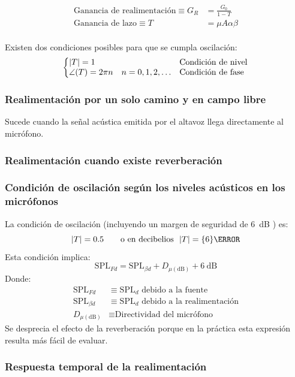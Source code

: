 \documentclass[a4paper, 8pt]{extarticle}
\begin{document}
\begin{multicols}{3}
  \begin{align*}
    \text{Ganancia de realimentación} \equiv G_R & = \frac{G_0}{1 - T}  \\
    \text{Ganancia de lazo} \equiv T             & = \mu A \alpha \beta \\
  \end{align*}

  Existen dos condiciones posibles para que se cumpla oscilación:
  \[ \left\lbrace
    \begin{matrix*}[l]
      \abs{T} = 1 & \text{Condición de nivel} \\
      \angle (T) = 2\pi n \quad n = 0,1,2, \ldots & \text{Condición de fase} \\
    \end{matrix*} \right. \]

  \subsubsection{Realimentación por un solo camino y en campo libre}
  Sucede cuando la señal acústica emitida por el altavoz llega directamente al micrófono.
  \subsubsection{Realimentación cuando existe reverberación}
  \subsubsection{Condición de oscilación según los niveles acústicos en los micrófonos}
  La condición de oscilación (incluyendo un margen de seguridad de \qty{6}{\dB} ) es:
  \[ \abs{T} = 0.5 \qquad \text{o en decibelios } \ \abs{T} = \qty{6}{\dB} \]
  Esta condición implica:
  \[ \text{SPL}_{Fd} = \text{SPL}_{\beta d} + D_{\mu \left( \unit{\dB} \right)} + \qty{6}{\dB} \]
  Donde:
  \begin{align*}
    \text{SPL}_{Fd}                   & \equiv \text{SPL}_d \text{ debido a la fuente}         \\
    \text{SPL}_{\beta d}              & \equiv \text{SPL}_d \text{ debido a la realimentación} \\
    D_{\mu \left( \unit{\dB} \right)} & \equiv \text{Directividad del micrófono}
  \end{align*}
  Se desprecia el efecto de la reverberación porque en la práctica esta expresión resulta más fácil de evaluar.

  \subsubsection{Respuesta temporal de la realimentación}

\end{multicols}
\end{document}
